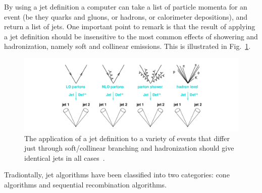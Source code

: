 By using a jet definition a computer can take a list of particle momenta for an event (be they quarks and gluons, or hadrons, or calorimeter depositions), and return a list of jets. One important point to remark is that the result of applying a jet definition should be insensitive to the most common effects of showering and hadronization, namely soft and collinear emissions. This is illustrated in Fig.~\ref{fig:jetdefinition}.

\begin{figure}[htbp]
  \begin{center}
      \includegraphics[width=1\textwidth]{Fig2/jetdefinition.png}
    \caption{The application of a jet definition to a variety of events that differ just through soft/collinear branching and hadronization should give identical jets in all cases~\cite{GavinLectures}.}
    \label{fig:jetdefinition}
  \end{center}
\end{figure}

Tradiontally, jet algorithms have been classified into two categories: cone algorithms and sequential recombination algorithms. 

